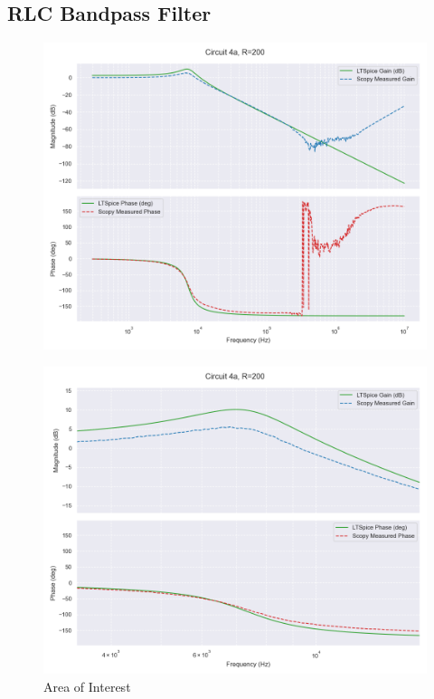 \documentclass[12pt]{article}
\begin{document}
\subsection{RLC Bandpass Filter}
\begin{figure}[H]
	\includegraphics[width=\textwidth]{e6_bode4}
\end{figure}
\begin{figure}[H]
	\includegraphics[width=\textwidth]{e6_bandbode}
	\caption{Area of Interest}
\end{figure}
\end{document}
